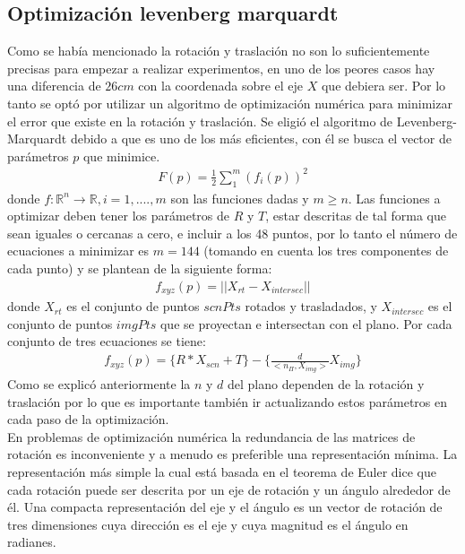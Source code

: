        	
       	\subsection{Optimización levenberg marquardt}
       	Como se había mencionado la rotación y traslación no son lo suficientemente precisas para empezar a realizar experimentos, en uno de los peores casos hay una diferencia de $26cm$ con la coordenada sobre el eje $X$ que debiera ser. Por lo tanto se optó por utilizar un algoritmo de optimización numérica para minimizar el error que existe en la rotación y traslación. Se eligió el algoritmo de Levenberg-Marquardt debido a que es uno de los más eficientes, con él se busca el vector de parámetros $p$ que minimice.
       	\begin{eqnarray}
       	F(p)=\frac{1}{2}\sum\limits_1^m(f_i(p))^2	
       	\end{eqnarray}
       	donde $f: \mathbb{R}^n\rightarrow \mathbb{R}, i=1,....,m$ son las funciones dadas y $m\geq n$.     	
       	Las funciones a optimizar deben tener los parámetros de $R$ y $T$, estar descritas de tal forma que sean iguales o cercanas a cero, e incluir a los 48 puntos, por lo tanto el número de ecuaciones a minimizar es $m=144$ (tomando en cuenta los tres componentes de cada punto) y se plantean de la siguiente forma:
       	\begin{eqnarray}
       	f_{xyz}(p)=||X_{rt}-X_{intersec}||
       	\end{eqnarray}
       	donde $X_{rt}$ es el conjunto de puntos $scnPts$ rotados y trasladados, y $X_{intersec}$ es el conjunto de puntos $imgPts$ que se proyectan e intersectan con el plano. Por cada conjunto de tres ecuaciones se tiene:
       	\begin{eqnarray}
       	f_{xyz}(p)= \{R*X_{scn}+T\}-\{ \frac{d}{<n_{\Pi},X_{img}>}X_{img} \}
       	\end{eqnarray}
       	Como se explicó anteriormente la $n$ y $d$ del plano dependen de la rotación y traslación por lo que es importante también ir actualizando estos parámetros en cada paso de la optimización. \\
       	En problemas de optimización numérica la redundancia de las matrices de rotación es inconveniente y a menudo es preferible una representación mínima. La representación más simple la cual está basada en el teorema de Euler dice que cada rotación puede ser descrita por un eje de rotación y un ángulo alrededor de él. Una compacta representación del eje y el ángulo es un vector de rotación de tres dimensiones cuya dirección es el eje y cuya magnitud es el ángulo en radianes.\\
